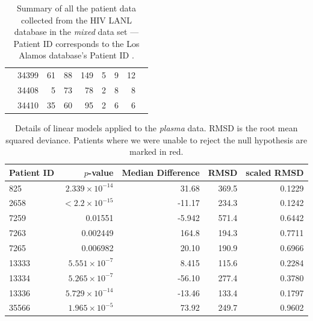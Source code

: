 \documentclass[12pt]{article}
\newcommand{\badpat}[1]{\rowcolor{red}#1}
\begin{document}
\begin{table}[!ht]
\begin{center}
\begin{tabular}{llrrrrrrr}
& 34399 &      61 &       88 &      149 &        5 &        9 &       12 \\
& 34408 &       5 &       73 &       78 &        2 &        8 &        8 \\
& 34410 &      35 &       60 &       95 &        2 &        6 &        6 \\
\hline
\end{tabular}
\end{center}
  \caption{Summary of all the patient data collected from the HIV LANL database in the \emph{mixed} data set --- Patient ID corresponds to the Los Alamos database's Patient ID \citep{LosAlamos}.
   }\label{tab:patients} 
\end{table}

\begin{table}[!ht]
\def\arraystretch{1.3}%
\begin{center}
\begin{tabular}{lrrrr} 
Patient ID & $p$-value & Median Difference & RMSD & scaled RMSD \\ 
\hline
825 & $2.339 \times 10^{-14}$ & 31.68 & 369.5 & 0.1229 \\
2658 & $< 2.2 \times 10^{-15}$  & -11.17 & 234.3 & 0.1242 \\
\badpat{7259 & 0.01551 & -5.942 & 571.4 & 0.6442} \\
7263 & 0.002449 & 164.8 & 194.3 & 0.7711 \\
7265 & 0.006982 & 20.10 & 190.9 & 0.6966 \\
13333 & $5.551 \times 10^{-7}$ & 8.415 & 115.6 & 0.2284 \\
13334 & $5.265 \times 10^{-7}$ & -56.10& 277.4 & 0.3780 \\
13336 & $5.729 \times 10^{-14}$ & -13.46 & 133.4 & 0.1797 \\
35566 & $1.965 \times 10^{-5}$ & 73.92 & 249.7 & 0.9602 \\
\hline
\end{tabular}
\end{center}
  \caption{Details of linear models applied to the \emph{plasma} data. RMSD is the root mean squared deviance. Patients where we were unable to reject the null hypothesis are marked in red.
   }\label{tab:patientsplasmaerror} 
\end{table}
\end{document}
